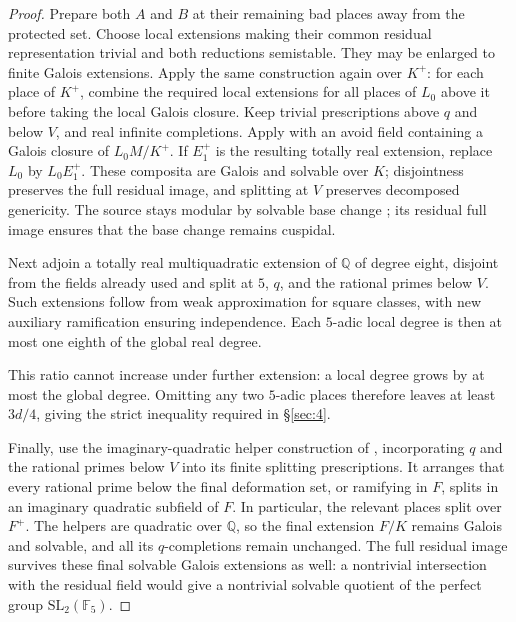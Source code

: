 \documentclass[11pt,a4paper]{article}
\numberwithin{equation}{section}
\begin{document}
\begin{proof}
Prepare both \(A\) and \(B\) at their remaining bad places away from the protected set. Choose local extensions making their common residual representation trivial and both reductions semistable. They may be enlarged to finite Galois extensions. Apply the same construction again over \(K^+\): for each place of \(K^+\), combine the required local extensions for all places of \(L_0\) above it before taking the local Galois closure. Keep trivial prescriptions above \(q\) and below \(V\), and real infinite completions. Apply \cite[Lemma~4.1.2]{CHT} with an avoid field containing a Galois closure of \(L_0M/K^+\). If \(E_1^+\) is the resulting totally real extension, replace \(L_0\) by \(L_0E_1^+\). These composita are Galois and solvable over \(K\); disjointness preserves the full residual image, and splitting at \(V\) preserves decomposed genericity. The source stays modular by solvable base change \cite[Proposition~6.5.13]{ACC}; its residual full image ensures that the base change remains cuspidal.

Next adjoin a totally real multiquadratic extension of \(\mathbb Q\) of degree eight, disjoint from the fields already used and split at \(5\), \(q\), and the rational primes below \(V\). Such extensions follow from weak approximation for square classes, with new auxiliary ramification ensuring independence. Each \(5\)-adic local degree is then at most one eighth of the global real degree.

This ratio cannot increase under further extension: a local degree grows by at most the global degree. Omitting any two \(5\)-adic places therefore leaves at least \(3d/4\), giving the strict inequality required in \S\ref{sec:4}.

Finally, use the imaginary-quadratic helper construction of \cite[\S6.5.12]{ACC}, incorporating \(q\) and the rational primes below \(V\) into its finite splitting prescriptions. It arranges that every rational prime below the final deformation set, or ramifying in \(F\), splits in an imaginary quadratic subfield of \(F\). In particular, the relevant places split over \(F^+\). The helpers are quadratic over \(\mathbb Q\), so the final extension \(F/K\) remains Galois and solvable, and all its \(q\)-completions remain unchanged. The full residual image survives these final solvable Galois extensions as well: a nontrivial intersection with the residual field would give a nontrivial solvable quotient of the perfect group \(\mathrm{SL}_2(\mathbb F_5)\).


\end{proof}
\end{document}
